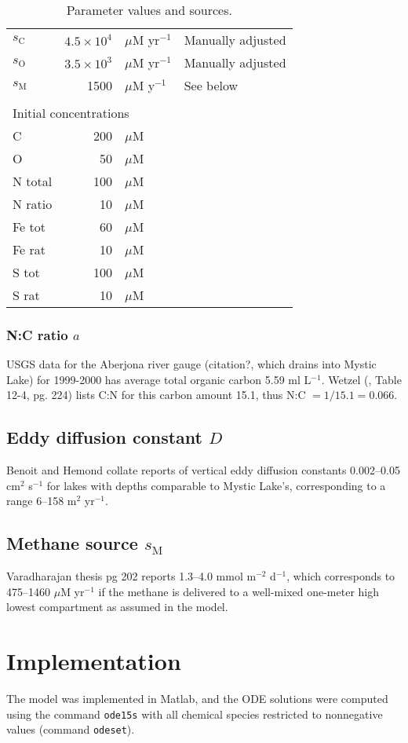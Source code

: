 \documentclass{report}
\begin{document}
\begin{table}
\begin{tabular}{ l r l l }
$s_\mathrm{C}$	&	$4.5 \times 10^4$ & $\mu$M yr$^{-1}$	&	Manually adjusted \\
$s_\mathrm{O}$	&	$3.5 \times 10^3$ & $\mu$M yr$^{-1}$	&	Manually adjusted \\
$s_\mathrm{M}$	&	1500 & $\mu$M y$^{-1}$	&	See below \\
\\
\multicolumn{4}{l}{Initial concentrations} \\
C	&	200 & $\mu$M \\
O	&	50 & $\mu$M \\
N total	&	100 & $\mu$M \\
N ratio	&	10 & $\mu$M \\
Fe tot	&	60 & $\mu$M \\
Fe rat	&	10 & $\mu$M \\
S tot	&	100 & $\mu$M \\
S rat	&	10 & $\mu$M \\
\bottomrule
\end{tabular}
\label{tab:parameters}
\caption{Parameter values and sources.}
\end{table}

\subsubsection{N:C ratio $a$}
USGS data for the Aberjona river gauge (citation?, which drains into Mystic Lake) for 1999-2000 has average total organic carbon 5.59 ml L$^{-1}$. Wetzel (\cite{Wetzel_2001}, Table 12-4, pg. 224) lists C:N for this carbon amount 15.1, thus N:C $= 1/15.1 = 0.066$.

\subsection{Eddy diffusion constant $D$}
Benoit and Hemond\cite{benoitvertical1996} collate reports of vertical eddy diffusion constants 0.002--0.05 cm$^2$ s$^{-1}$ for lakes with depths comparable to Mystic Lake's, corresponding to a range 6--158 m$^2$ yr$^{-1}$.

\subsection{Methane source $s_\mathrm{M}$}
Varadharajan thesis pg 202 reports 1.3--4.0 mmol m$^{-2}$ d$^{-1}$, which corresponds to 475--1460 $\mu$M yr$^{-1}$ if the methane is delivered to a well-mixed one-meter high lowest compartment as assumed in the model.

\section{Implementation}
The model was implemented in Matlab, and the ODE solutions were computed using the command {\tt ode15s} with all chemical species restricted to nonnegative values (command {\tt odeset}).



\end{document}
